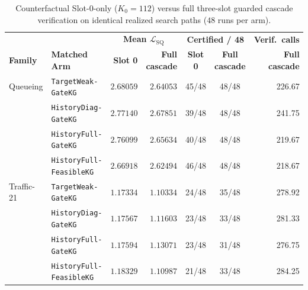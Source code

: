 \begin{table}[htbp]\centering
\caption{Counterfactual Slot-0-only ($K_0=112$) versus full three-slot guarded cascade verification on identical realized search paths ($48$ runs per arm).}\label{tab:terminal_replay}
\scriptsize\begin{tabular}{llrrccr}\toprule
& & \multicolumn{2}{c}{\textbf{Mean $\mathcal{L}_{\mathrm{SQ}}$}} & \multicolumn{2}{c}{\textbf{Certified / 48}} & \textbf{Verif.\ calls} \\
\textbf{Family} & \textbf{Matched Arm} & \textbf{Slot 0} & \textbf{Full cascade} & \textbf{Slot 0} & \textbf{Full cascade} & \textbf{Full cascade} \\
\midrule
Queueing & \texttt{TargetWeak-GateKG} & $2.68059$ & $2.64053$ & 45/48 & 48/48 & 226.67 \\
 & \texttt{HistoryDiag-GateKG} & $2.77140$ & $2.67851$ & 39/48 & 48/48 & 241.75 \\
 & \texttt{HistoryFull-GateKG} & $2.76099$ & $2.65634$ & 40/48 & 48/48 & 219.67 \\
 & \texttt{HistoryFull-FeasibleKG} & $2.66918$ & $2.62494$ & 46/48 & 48/48 & 218.67 \\
\midrule
Traffic-21 & \texttt{TargetWeak-GateKG} & $1.17334$ & $1.10334$ & 24/48 & 35/48 & 278.92 \\
 & \texttt{HistoryDiag-GateKG} & $1.17567$ & $1.11603$ & 23/48 & 33/48 & 281.33 \\
 & \texttt{HistoryFull-GateKG} & $1.17594$ & $1.13071$ & 23/48 & 31/48 & 276.75 \\
 & \texttt{HistoryFull-FeasibleKG} & $1.18329$ & $1.10987$ & 21/48 & 33/48 & 284.25 \\
\bottomrule\end{tabular}
\end{table}
